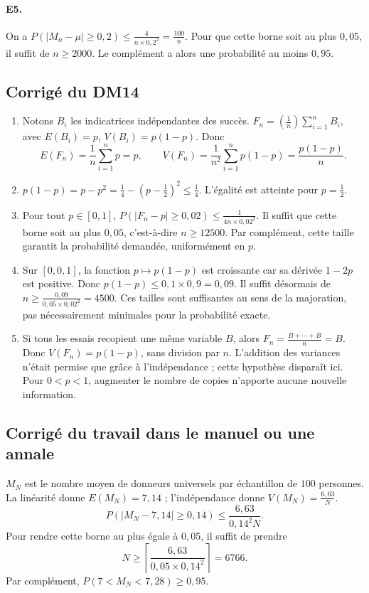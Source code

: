 \paragraph{E5.}On a $P(|M_n-\mu|\ge0{,}2)\le\frac{4}{n\times0{,}2^2}=\frac{100}{n}$. Pour que cette borne soit au plus $0{,}05$, il suffit de $n\ge2000$. Le complément a alors une probabilité au moins $0{,}95$.

\subsection{Corrigé du DM14}\begin{enumerate}
\item Notons $B_i$ les indicatrices indépendantes des succès. $F_n=(\frac{1}{n})\sum_{i=1}^nB_i$, avec $E(B_i)=p$, $V(B_i)=p(1-p)$. Donc
\[E(F_n)=\frac1n\sum_{i=1}^n p=p,\qquad V(F_n)=\frac1{n^2}\sum_{i=1}^np(1-p)=\frac{p(1-p)}n.\]
\item $p(1-p)=p-p^2=\frac{1}{4}-(p-\frac{1}{2})^2\le\frac{1}{4}$. L'égalité est atteinte pour $p=\frac{1}{2}$.
\item Pour tout $p\in[0,1]$, $P(|F_n-p|\ge0{,}02)\le\frac{1}{4n\times0{,}02^2}$. Il suffit que cette borne soit au plus $0{,}05$, c'est-à-dire $n\ge12500$. Par complément, cette taille garantit la probabilité demandée, uniformément en $p$.
\item Sur $[0,0{,}1]$, la fonction $p\mapsto p(1-p)$ est croissante car sa dérivée $1-2p$ est positive. Donc $p(1-p)\le0{,}1\times0{,}9=0{,}09$. Il suffit désormais de $n\ge\frac{0{,}09}{0{,}05\times0{,}02^2}=4500$. Ces tailles sont suffisantes au sens de la majoration, pas nécessairement minimales pour la probabilité exacte.
\item Si tous les essais recopient une même variable $B$, alors $F_n=\frac{B+\cdots+B}{n}=B$. Donc $V(F_n)=p(1-p)$, sans division par $n$. L'addition des variances n'était permise que grâce à l'indépendance ; cette hypothèse disparaît ici. Pour $0<p<1$, augmenter le nombre de copies n'apporte aucune nouvelle information.
\end{enumerate}

\subsection{Corrigé du travail dans le manuel ou une annale}$M_N$ est le nombre moyen de donneurs universels par échantillon de $100$ personnes. La linéarité donne $E(M_N)=7{,}14$ ; l'indépendance donne $V(M_N)=\frac{6{,}63}N$.
\[P(|M_N-7{,}14|\ge0{,}14)\le\frac{6{,}63}{0{,}14^2N}.\]
Pour rendre cette borne au plus égale à $0{,}05$, il suffit de prendre
\[N\ge\left\lceil\frac{6{,}63}{0{,}05\times0{,}14^2}\right\rceil=6766.\]
Par complément, $P(7<M_N<7{,}28)\ge0{,}95$.

\fi

